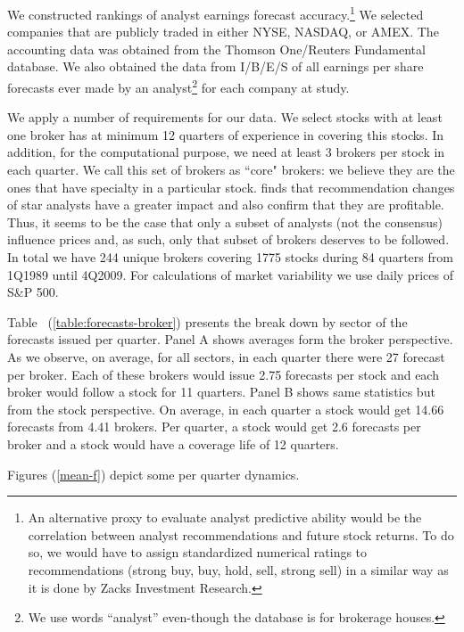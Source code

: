 \documentclass{article}\usepackage[]{graphicx}\usepackage[]{color}
\begin{document}
We constructed rankings of analyst earnings forecast accuracy.\footnote{An alternative proxy to evaluate analyst predictive ability would be the correlation between analyst recommendations and future stock returns. To do so, we would have to assign standardized numerical ratings to recommendations (strong buy, buy, hold, sell, strong sell) in a similar way as it is done by Zacks Investment Research.}
We selected companies that are publicly traded in either NYSE, NASDAQ, or AMEX. The accounting data was obtained from the Thomson One/Reuters Fundamental database. We also obtained the data from I/B/E/S of all earnings per share forecasts ever made by an analyst\footnote{We use words ``analyst''  even-though the database is for brokerage houses.}  for each company at study. 

We apply a number of requirements for our data. We select stocks with at least one broker has at minimum 12 quarters of experience in covering this stocks. In addition, for the computational purpose, we need at least 3 brokers per stock in each quarter.  We call this set of brokers as ``core" brokers: we believe they are  the ones that have specialty in a particular stock. \cite{stickel1995} finds that recommendation changes of star analysts have a greater impact and \cite{fang2008aso} also confirm that they are profitable. Thus, it seems to be the case that only a subset of analysts (not the consensus) influence prices and, as such, only that subset of brokers deserves to be followed. In total we have 244 unique brokers covering 1775 stocks during 84  quarters from 1Q1989 until 4Q2009. For calculations of market variability we use daily prices of S\&P 500.  


Table ~(\ref{table:forecasts-broker}) presents the break down by sector of the forecasts issued per quarter.  Panel A shows averages form the broker perspective. As we observe, on average, for all sectors, in each quarter there were 27 forecast per broker. Each of these brokers would issue 2.75 forecasts per stock and each broker would follow a stock for 11 quarters. Panel B shows same statistics but from the stock perspective.  On average, in each quarter a stock would get 14.66 forecasts from 4.41 brokers. Per quarter, a stock would get 2.6 forecasts per broker and a stock would have a coverage life of 12 quarters. 

Figures (\ref{mean-f}) depict some per quarter dynamics. %
\end{document}
